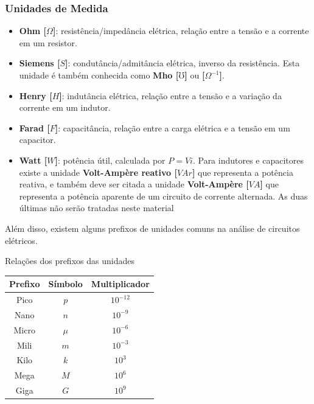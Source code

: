 \documentclass{article}
\numberwithin{equation}{section}
\begin{document}
    \subsubsection{Unidades de Medida}
    \begin{itemize}
        \item \textbf{Ohm [$\Omega$]}: resistência/impedância elétrica, relação entre a tensão e a corrente em um resistor.
        \item \textbf{Siemens [$S$]}: condutância/admitância elétrica, inverso da resistência. Esta unidade é também conhecida como \textbf{Mho [$\mho$]} ou \textbf{[$\Omega^{-1}$]}.
        \item \textbf{Henry [$H$]}: indutância elétrica, relação entre a tensão e a variação da corrente em um indutor.
        \item \textbf{Farad [$F$]}: capacitância, relação entre a carga elétrica e a tensão em um capacitor.
        \item \textbf{Watt [$W$]}: potência útil, calculada por $P=Vi$. Para indutores e capacitores existe a unidade \textbf{Volt-Ampère reativo [$VAr$]} que representa a potência reativa, e também deve ser citada a unidade \textbf{Volt-Ampère [$VA$]} que representa a potência aparente de um circuito de corrente alternada. As duas últimas não serão tratadas neste material
    \end{itemize}

    Além disso, existem alguns prefixos de unidades comuns na análise de circuitos elétricos.

    \begin{center}
        Relações dos prefixos das unidades \\
        \begin{tabular}{|c|c|c|} \hline
            Prefixo & Símbolo & Multiplicador \\ \hline
            Pico & $p$ & $10^{-12}$ \\
            Nano & $n$ & $10^{-9}$ \\
            Micro & $\mu$ & $10^{-6}$ \\
            Mili & $m$ & $10^{-3}$ \\
            Kilo & $k$ & $10^{3}$ \\
            Mega & $M$ & $10^{6}$ \\
            Giga & $G$ & $10^{9}$ \\ \hline
        \end{tabular}
    \end{center}
\end{document}
